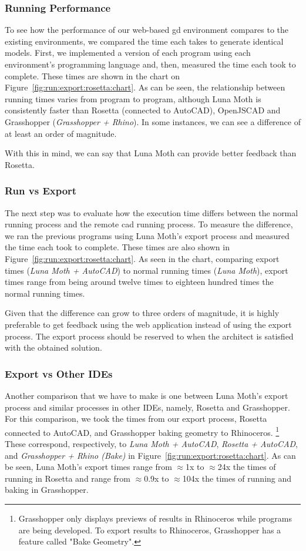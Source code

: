 \subsubsection{Running Performance}
To see how the performance of our web-based \gls{gd} environment compares to the existing environments, we compared the time each takes to generate identical models.
First, we implemented a version of each program using each environment's programming language and, then, measured the time each took to complete.
These times are shown in the chart on Figure~\ref{fig:run:export:rosetta:chart}.
As can be seen, the relationship between running times varies from program to program, although Luna Moth is consistently faster than Rosetta (connected to AutoCAD), OpenJSCAD and Grasshopper (\textit{Grasshopper + Rhino}).
In some instances, we can see a difference of at least an order of magnitude.

With this in mind, we can say that Luna Moth can provide better feedback than Rosetta.


\subsubsection{Run vs Export}
The next step was to evaluate how the execution time differs between the normal running process and the remote \gls{cad} running process.
To measure the difference, we ran the previous programs using Luna Moth's export process and measured the time each took to complete.
These times are also shown in Figure~\ref{fig:run:export:rosetta:chart}.
As seen in the chart, comparing export times (\textit{Luna Moth + AutoCAD}) to normal running times (\textit{Luna Moth}), export times range from being around twelve times to eighteen hundred times the normal running times.

Given that the difference can grow to three orders of magnitude, it is highly preferable to get feedback using the web application instead of using the export process.
The export process should be reserved to when the architect is satisfied with the obtained solution.


\subsubsection{Export vs Other IDEs}
Another comparison that we have to make is one between Luna Moth's export process and similar processes in other IDEs, namely, Rosetta and Grasshopper.
For this comparison, we took the times from our export process, Rosetta connected to AutoCAD, and Grasshopper baking geometry to Rhinoceros.%
\footnote{Grasshopper only displays previews of results in Rhinoceros while programs are being developed. To export results to Rhinoceros, Grasshopper has a feature called "Bake Geometry".}
These correspond, respectively, to \textit{Luna Moth + AutoCAD}, \textit{Rosetta + AutoCAD}, and \textit{Grasshopper + Rhino (Bake)} in Figure~\ref{fig:run:export:rosetta:chart}.
As can be seen, Luna Moth's export times range from $\approx$1x to $\approx$24x the times of running in Rosetta and range from $\approx$0.9x to $\approx$104x the times of running and baking in Grasshopper.


